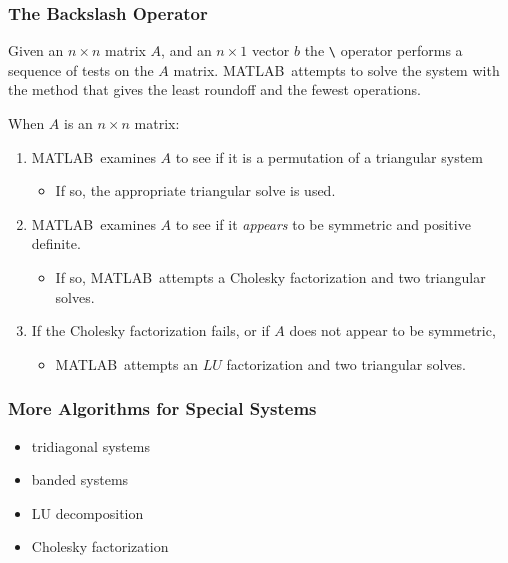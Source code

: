 \documentclass[10pt]{beamer}
\newcommand{\matdim}[2]{\ensuremath{#1\times#2}}
\begin{document}
\begin{frame}[fragile]
\frametitle{The Backslash Operator}

Given an \matdim{n}{n} matrix $A$, and an \matdim{n}{1} vector $b$
the \verb|\| operator performs a sequence of tests on the $A$ matrix.
MATLAB\ attempts to solve the system with the method that gives the
least roundoff and the fewest operations.

When $A$ is an \matdim{n}{n} matrix:
\vspace{0.0cm}
\begin{enumerate}
    \item   MATLAB\ examines $A$ to see if it is a permutation of a triangular system
            \begin{itemize}
                \item[]   If so, the appropriate triangular solve is used.
            \end{itemize}
            \vspace{3ex}

    \item   MATLAB\ examines $A$ to see if it \emph{appears} to be symmetric and positive
            definite.
           \begin{itemize}
                \item[]   If so, MATLAB\ attempts a Cholesky factorization\newline
                          and two triangular solves.
           \end{itemize}
            \vspace{3ex}

    \item   If the Cholesky factorization fails, or if $A$ does not appear to
            be symmetric,
            \begin{itemize}
           \item[] MATLAB\ attempts an $LU$ factorization\newline
                    and two triangular solves.
        \end{itemize}
\end{enumerate}

\end{frame}
\begin{frame}
\frametitle{More Algorithms for Special Systems}
  \begin{itemize}
    \item tridiagonal systems
    \item banded systems
    \item LU decomposition
    \item Cholesky factorization
  \end{itemize}
\end{frame}
\end{document}
